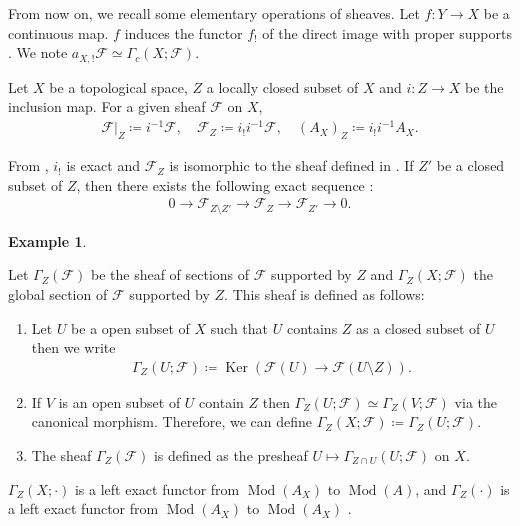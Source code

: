 \documentclass[a4paper,dvipdfmx,reqno,12pt]{amsart}
\theoremstyle{definition}
\newtheorem{example}[theorem]{Example}
\newcommand{\deq}{\coloneqq}
\newcommand{\mcal}[1]{\mathcal{#1}}%
\newcommand{\opn}[1]{\operatorname{#1}}
\numberwithin{equation}{section}
\begin{document}
From now on, we recall some elementary 
operations of sheaves. 
Let $f\colon Y\to X$ be a continuous map.
$f$ induces the functor $f_!$ of
the direct image with proper supports 
\cite[(2.5.1)]{MR1299726}. 
We note $a_{X,!}\mathcal{F}\simeq \Gamma_c(X;\mathcal{F})$.

Let $X$ be a topological space, $Z$ a locally closed 
subset of $X$
and $i\colon Z\to X$ be the inclusion map.
For a given sheaf $\mathcal{F}$ on $X$, 
\begin{align}
\mcal{F}|_{Z}\deq i^{-1}\mcal{F}, \quad 
\mcal{F}_Z\deq i_! i^{-1}\mcal{F}, \quad 
(A_X)_Z\deq i_!i^{-1}A_X.
\end{align}

From \cite[Proposition 2.5.4]{MR1299726}, $i_!$ is exact 
and $\mcal{F}_Z$ is isomorphic to the sheaf defined in
\cite[p.93]{MR1299726}.
If $Z'$ be a closed subset of $Z$, then
there exists the following exact sequence 
\cite[Proposition 2.3.6.(v)]{MR1299726}:
\begin{align}
0\to \mathcal{F}_{Z\setminus Z'} \to 
\mathcal{F}_Z \to \mathcal{F}_{Z'}\to 0.
\end{align}

\begin{example}

\end{example}

Let $\Gamma_{Z}(\mcal{F})$ be the sheaf of sections of 
$\mcal{F}$ supported by $Z$
\cite[Definition 2.3.8]{MR1299726} and 
$\Gamma_{Z}(X;\mcal{F})$ the global section of 
$\mathcal{F}$ supported by $Z$.
This sheaf is defined as follows:

\begin{enumerate}
\item Let $U$ be a open subset of $X$ such that $U$ contains
$Z$ as a closed subset of $U$ then we write
\begin{align}
  \Gamma_Z(U;\mcal{F})\deq \opn{Ker}(\mcal{F}(U) \to 
\mcal{F}(U\setminus Z)).
\end{align}
\item If $V$ is an open subset of $U$ contain $Z$ then
$\Gamma_{Z}(U;\mcal{F})\simeq \Gamma_{Z}(V;\mcal{F})$
via the canonical morphism. Therefore, we can define
$\Gamma_{Z}(X;\mcal{F})\deq \Gamma_{Z}(U;\mcal{F})$.
\item The sheaf $\Gamma_{Z}(\mcal{F})$ is defined as the presheaf 
$U\mapsto \Gamma_{Z\cap U}(U;\mcal{F})$ on $X$.
\end{enumerate}

$\Gamma_Z(X;\cdot)$ is a left exact functor from 
$\opn{Mod}(A_X)$ to $\opn{Mod}(A)$,
and $\Gamma_{Z}(\cdot)$ is a left exact functor from
$\opn{Mod}(A_X)$ to $\opn{Mod}(A_X)$ 
\cite[Proposition 2.3.9 (i)]{MR1299726}.
\end{document}
